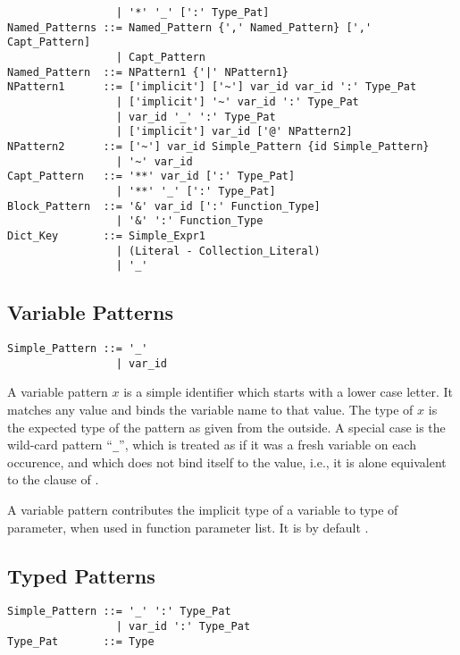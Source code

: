 \begin{lstlisting}
                 | '*' '_' [':' Type_Pat]
Named_Patterns ::= Named_Pattern {',' Named_Pattern} [',' Capt_Pattern]
                 | Capt_Pattern
Named_Pattern  ::= NPattern1 {'|' NPattern1}
NPattern1      ::= ['implicit'] ['~'] var_id var_id ':' Type_Pat
                 | ['implicit'] '~' var_id ':' Type_Pat
                 | var_id '_' ':' Type_Pat
                 | ['implicit'] var_id ['@' NPattern2]
NPattern2      ::= ['~'] var_id Simple_Pattern {id Simple_Pattern}
                 | '~' var_id
Capt_Pattern   ::= '**' var_id [':' Type_Pat]
                 | '**' '_' [':' Type_Pat]
Block_Pattern  ::= '&' var_id [':' Function_Type]
                 | '&' ':' Function_Type
Dict_Key       ::= Simple_Expr1
                 | (Literal - Collection_Literal)
                 | '_'
\end{lstlisting}






\subsection{Variable Patterns}
\label{sec:variable-patterns}

\syntax\begin{lstlisting}
Simple_Pattern ::= '_'
                 | var_id
\end{lstlisting}

A variable pattern $x$ is a simple identifier which starts with a lower case letter. It matches any value and binds the variable name to that value. The type of $x$ is the expected type of the pattern as given from the outside. A special case is the wild-card pattern ``\lstinline!_!'', which is treated as if it was a fresh variable on each occurence, and which does not bind itself to the value, i.e., it is alone equivalent to the  clause of . 

A variable pattern contributes the implicit type of a variable to type of parameter, when used in function parameter list. It is by default . 






\subsection{Typed Patterns}
\label{sec:typed-patterns}

\syntax\begin{lstlisting}
Simple_Pattern ::= '_' ':' Type_Pat
                 | var_id ':' Type_Pat
Type_Pat       ::= Type
\end{lstlisting}

